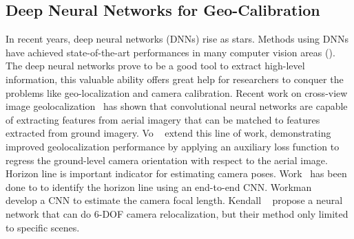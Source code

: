 \subsection{Deep Neural Networks for Geo-Calibration}
In recent years, deep neural networks (DNNs) rise as stars. Methods
using DNNs have achieved state-of-the-art performances in many computer
vision areas (). 
The deep neural networks prove to be a good tool to extract high-level
information, this valuable ability offers great help for researchers
to conquer the problems like geo-localization and camera calibration.
Recent work on cross-view image
geolocalization~\cite{lin2013cross,lin2015learning,workman2015geocnn,workman2015wide}
has shown that convolutional neural networks are capable of extracting
features from aerial imagery that can be matched to features extracted
from ground imagery.  Vo \etal~\cite{vo2016localizing} extend this
line of work, demonstrating improved geolocalization performance by
applying an auxiliary loss function to regress the ground-level camera
orientation with respect to the aerial image.  Horizon line is
important indicator for estimating camera poses.
Work~\cite{workman2016horizon, hold2017perceptual} has been done to to
identify the horizon line using an end-to-end CNN. Workman
\etal~\cite{workman2015deepfocal} develop a CNN to estimate the camera
focal length. Kendall \etal~\cite{kendall2015convolutional} propose a
neural network that can do 6-DOF camera relocalization, but their
method only limited to specific scenes.

